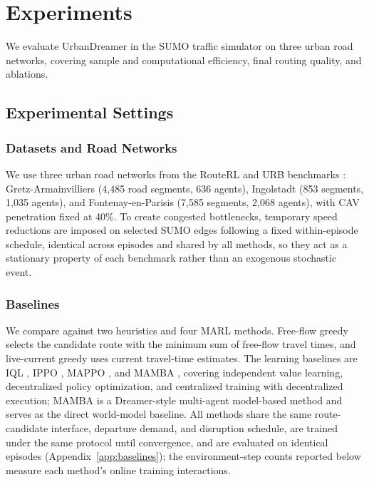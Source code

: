 \section{Experiments}

We evaluate UrbanDreamer in the SUMO traffic simulator \cite{lopez2018microscopic} on three urban road networks, covering sample and computational efficiency, final routing quality, and ablations.

\subsection{Experimental Settings}

\subsubsection{Datasets and Road Networks}

We use three urban road networks from the RouteRL and URB benchmarks \cite{akman2025routerl,akman2026urb}: Gretz-Armainvilliers (4,485 road segments, 636 agents), Ingolstadt \cite{lobo2020intas} (853 segments, 1,035 agents), and Fontenay-en-Parisis (7,585 segments, 2,068 agents), with CAV penetration fixed at 40\%. To create congested bottlenecks, temporary speed reductions are imposed on selected SUMO edges following a fixed within-episode schedule, identical across episodes and shared by all methods, so they act as a stationary property of each benchmark rather than an exogenous stochastic event.


\subsubsection{Baselines}

We compare against two heuristics and four MARL methods. Free-flow greedy selects the candidate route with the minimum sum of free-flow travel times, and live-current greedy uses current travel-time estimates. The learning baselines are IQL \cite{iql}, IPPO \cite{ippo}, MAPPO \cite{mappo}, and MAMBA \cite{mamba}, covering independent value learning, decentralized policy optimization, and centralized training with decentralized execution; MAMBA is a Dreamer-style multi-agent model-based method and serves as the direct world-model baseline. All methods share the same route-candidate interface, departure demand, and disruption schedule, are trained under the same protocol until convergence, and are evaluated on identical episodes (Appendix~\ref{app:baselines}); the environment-step counts reported below measure each method's online training interactions.

